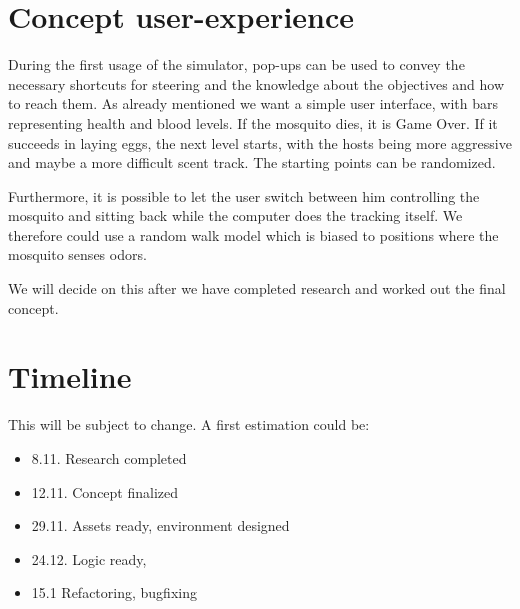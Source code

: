 \documentclass{acm_proc_article-sp}
\begin{document}
\section{Concept user-experience}
During the first usage of the simulator, pop-ups can be used to convey the necessary shortcuts for steering and the knowledge about the objectives and how to reach them. As already mentioned we want a simple user interface, with bars representing health and blood levels. If the mosquito dies, it is Game Over. If it succeeds in laying eggs, the next level starts, with the hosts being more aggressive and maybe a more difficult scent track. The starting points can be randomized.

Furthermore, it is possible to let the user switch between him controlling the mosquito and sitting back while the computer does the tracking itself. We therefore could use a random walk model which is biased to positions where the mosquito senses odors.

We will decide on this after we have completed research and worked out the final concept.


\section{Timeline}
This will be subject to change. A first estimation could be:

\begin{itemize}
	\item	8.11. Research completed
	\item 12.11. Concept finalized
	\item 29.11. Assets ready, environment designed
	\item 24.12. Logic ready,
	\item 15.1	Refactoring, bugfixing
\end{itemize}








%

%
%

\balancecolumns
\end{document}
